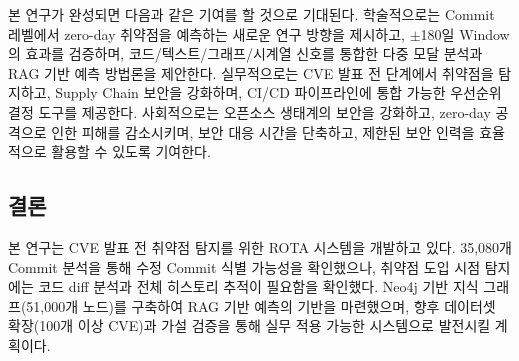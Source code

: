 ﻿\documentclass[conference]{IEEEtran}
\begin{document}
본 연구가 완성되면 다음과 같은 기여를 할 것으로 기대된다. 학술적으로는 Commit 레벨에서 zero-day 취약점을 예측하는 새로운 연구 방향을 제시하고, $\pm$180일 Window의 효과를 검증하며, 코드/텍스트/그래프/시계열 신호를 통합한 다중 모달 분석과 RAG 기반 예측 방법론을 제안한다. 실무적으로는 CVE 발표 전 단계에서 취약점을 탐지하고, Supply Chain 보안을 강화하며, CI/CD 파이프라인에 통합 가능한 우선순위 결정 도구를 제공한다. 사회적으로는 오픈소스 생태계의 보안을 강화하고, zero-day 공격으로 인한 피해를 감소시키며, 보안 대응 시간을 단축하고, 제한된 보안 인력을 효율적으로 활용할 수 있도록 기여한다.

\subsection{결론}

본 연구는 CVE 발표 전 취약점 탐지를 위한 ROTA 시스템을 개발하고 있다. 35,080개 Commit 분석을 통해 수정 Commit 식별 가능성을 확인했으나, 취약점 도입 시점 탐지에는 코드 diff 분석과 전체 히스토리 추적이 필요함을 확인했다. Neo4j 기반 지식 그래프(51,000개 노드)를 구축하여 RAG 기반 예측의 기반을 마련했으며, 향후 데이터셋 확장(100개 이상 CVE)과 가설 검증을 통해 실무 적용 가능한 시스템으로 발전시킬 계획이다.
\end{document}
